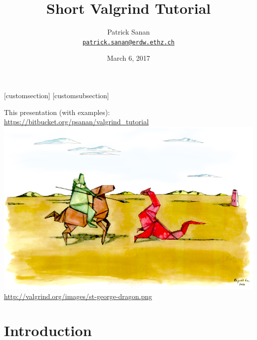 \documentclass{beamer}
\author[Patrick Sanan]{Patrick Sanan \\ \href{mailto:patrick.sanan@erdw.ethz.ch}{\texttt{patrick.sanan@erdw.ethz.ch}}}
\title[]{Short Valgrind Tutorial}
\date[]{March 6, 2017}
\begin{document}
[customsection]
[customsubsection]


\begin{frame}[fragile]
\titlepage 
\begin{center}
  This presentation (with examples): \url{https://bitbucket.org/psanan/valgrind_tutorial} \\
\includegraphics[height=0.25\textheight]{st-george-dragon.png}\\
{\tiny \url{http://valgrind.org/images/st-george-dragon.png}}
\end{center}
\end{frame}

\section{Introduction}
\end{document}
